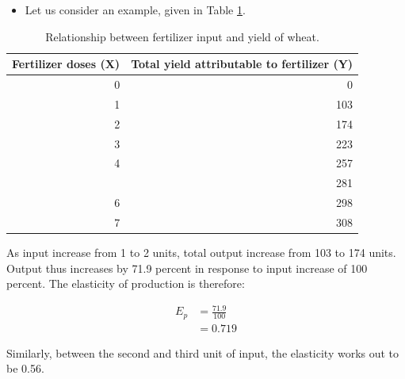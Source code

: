 \documentclass[12pt,ignorenonframetext,aspectratio=169]{beamer}
\providecommand{\tightlist}{%
  \setlength{\itemsep}{0pt}\setlength{\parskip}{0pt}}
\begin{document}
\begin{frame}{}
\protect\hypertarget{section-9}{}
\begin{itemize}
\tightlist
\item
  Let us consider an example, given in Table
  \ref{tab:elasticity-production}.
\end{itemize}

\begin{table}

\caption{\label{tab:elasticity-production}Relationship between fertilizer input and yield of wheat.}
\centering
\fontsize{8}{10}\selectfont
\begin{tabular}[t]{rr}
\toprule
Fertilizer doses (X) & Total yield attributable to fertilizer (Y)\\
\midrule
\rowcolor{gray!6}  0 & 0\\
1 & 103\\
\rowcolor{gray!6}  2 & 174\\
3 & 223\\
\rowcolor{gray!6}  4 & 257\\
\addlinespace
5 & 281\\
\rowcolor{gray!6}  6 & 298\\
7 & 308\\
\bottomrule
\end{tabular}
\end{table}
\end{frame}

\begin{frame}{}
\protect\hypertarget{section-10}{}
As input increase from 1 to 2 units, total output increase from 103 to
174 units. Output thus increases by 71.9 percent in response to input
increase of 100 percent. The elasticity of production is therefore:

\[
\begin{aligned}
E_p &= {\frac{71.9}{100}} \\
&= 0.719
\end{aligned}
\]

Similarly, between the second and third unit of input, the elasticity
works out to be 0.56.
\end{frame}
\end{document}
